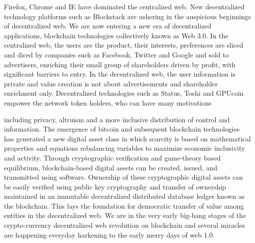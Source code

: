 \documentclass{article}
\begin{document}
Firefox, Chrome and IE have dominated the centralized web. New decentralized technology platforms such as Blockstack are ushering in the auspicious beginnings of decentralized web. 
We are now entering a new era of decentralized applications, blockchain technologies collectively known as Web 3.0. In the centralized web, the users are the product, their interests, preferences are sliced and diced by companies such as Facebook, Twitter and Google and sold to advertisers, enriching their small group of shareholders driven by profit, with significant barriers to entry. In the
decentralized web, the user information is private and value creation is not about advertisements and shareholder enrichment only. Decentralized
technologies such as Status, Toshi and GPUcoin empower the network token holders, who can have many motivations 

 including privacy, altruism and a more inclusive distribution of control and information. The emergence of bitcoin and subsequent blockchain technologies has generated a new digital asset class in which scarcity is based on mathematical properties and equations rebalancing variables to maximize economic inclusivity and activity. Through cryptographic verification and game-theory based equilibrium, blockchain-based digital assets can be created, issued, and transmitted using software. Ownership of these cryptographic digital assets can be easily verified using public key cryptography and transfer of ownership maintained in an immutable decentralized distributed database ledger known as the blockchain. This lays the foundation for democratic transfer of value among entities in the decentralized web.
We are in the very early big-bang stages of the crypto-currency decentralized web revolution on blockchain and several miracles are happening everyday harkening to the early merry days of web 1.0.
\end{document}
